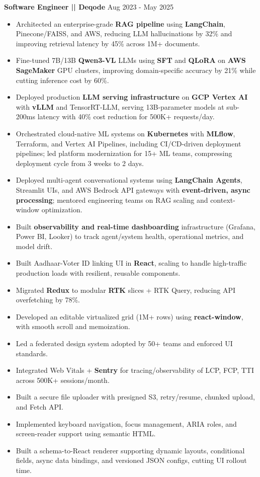 \documentclass[100pt,a4paper]{article}
\begin{document}
\vspace{5pt}
\textbf{Software Engineer || Deqode}
\hfill Aug 2023 - May 2025
\begin{itemize}
\vspace{2pt}
\item {Architected an enterprise-grade \textbf{RAG pipeline} using \textbf{LangChain}, Pinecone/FAISS, and AWS, reducing LLM hallucinations by 32\% and improving retrieval latency by 45\% across 1M+ documents.}
\item {Fine-tuned 7B/13B \textbf{Qwen3-VL} LLMs using \textbf{SFT} and \textbf{QLoRA} on \textbf{AWS SageMaker} GPU clusters, improving domain-specific accuracy by 21\% while cutting inference cost by 60\%.}
\item {Deployed production \textbf{LLM serving infrastructure} on \textbf{GCP Vertex AI} with \textbf{vLLM} and TensorRT-LLM, serving 13B-parameter models at sub-200ms latency with 40\% cost reduction for 500K+ requests/day.}
\item {Orchestrated cloud-native ML systems on \textbf{Kubernetes} with \textbf{MLflow}, Terraform, and Vertex AI Pipelines, including CI/CD-driven deployment pipelines; led platform modernization for 15+ ML teams, compressing deployment cycle from 3 weeks to 2 days.}
\item {Deployed multi-agent conversational systems using \textbf{LangChain Agents}, Streamlit UIs, and AWS Bedrock API gateways with \textbf{event-driven, async processing}; mentored engineering teams on RAG scaling and context-window optimization.}
\item {Built \textbf{observability and real-time dashboarding} infrastructure (Grafana, Power BI, Looker) to track agent/system health, operational metrics, and model drift.}
\item {Built Aadhaar-Voter ID linking UI in \textbf{React}, scaling to handle high-traffic production loads with resilient, reusable components.}
\item {Migrated \textbf{Redux} to modular \textbf{RTK} slices + RTK Query, reducing API overfetching by 78\%.}
\item {Developed an editable virtualized grid (1M+ rows) using \textbf{react-window}, with smooth scroll and memoization.}
\item {Led a federated design system adopted by 50+ teams and enforced UI standards.}
\item {Integrated Web Vitals + \textbf{Sentry} for tracing/observability of LCP, FCP, TTI across 500K+ sessions/month.}
\item {Built a secure file uploader with presigned S3, retry/resume, chunked upload, and Fetch API.}
\item {Implemented keyboard navigation, focus management, ARIA roles, and screen-reader support using semantic HTML.}
\item {Built a schema-to-React renderer supporting dynamic layouts, conditional fields, async data bindings, and versioned JSON configs, cutting UI rollout time.}
\end{itemize}
\end{document}
